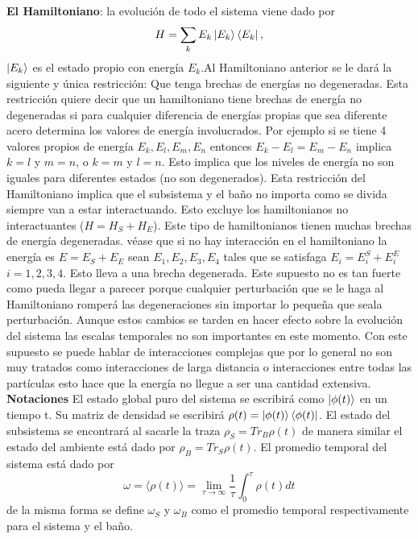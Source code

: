 \textbf{El Hamiltoniano}: la evolución de todo el sistema viene dado por 
\begin{equation}
H= \sum_{k} E_{k} \ket{E_{k}} \bra{E_{k}},
\end{equation}
$\ket{E_{k}}$ es el estado propio con energía $E_{k}$.Al Hamiltoniano anterior se le dará la siguiente y única restricción: Que tenga brechas de energías no degeneradas. Esta restricción quiere decir que  un hamiltoniano tiene brechas de energía no degeneradas si para cualquier diferencia de energías propias que sea diferente acero determina los valores de energía involucrados. Por ejemplo si se tiene 4 valores propios de energía $E_{k}, E_{l},E_{m},E_{n}$ entonces $E_{k}-E_{l}=E_{m}-E_{n} $ implica $k=l$ y $m=n$, o $k=m$ y $l=n$. Esto implica que los niveles de energía no son iguales para diferentes estados (no son degenerados).
Esta restricción del Hamiltoniano implica que el subsistema y el baño no importa como se divida siempre van a estar interactuando. Esto excluye los hamiltonianos no interactuantes ($H=H_{S}+H_{E}$). Este tipo de hamiltonianos tienen muchas brechas de energía degeneradas. véase que si no hay interacción en el hamiltoniano la energía es $E=E_{S}+E_{E}$ sean $E_{1},E_{2},E_{3},E_{4}$ tales que se satisfaga $E_{i}=E_{i}^{S}+E_{i}^{E}$ $i=1,2,3,4$. Esto lleva a una brecha degenerada. Este supuesto no es tan fuerte como pueda llegar a parecer porque cualquier perturbación que se le haga al Hamiltoniano romperá las degeneraciones sin importar lo pequeña que seala perturbación. Aunque estos cambios se tarden en hacer efecto sobre la evolución del sistema las escalas temporales no son importantes en este momento. Con este supuesto se puede hablar de interacciones complejas que por lo general no son muy tratados como interacciones de larga distancia o interacciones entre todas las partículas esto hace que la energía no llegue a ser una cantidad extensiva.
\textbf{Notaciones} El estado global puro del sistema se escribirá como $\ket{\phi(t)}$ en un tiempo t. Su matriz de densidad se escribirá $\rho(t)=\ket{\phi(t)}\bra{\phi(t)}$. El estado del subsistema se encontrará al sacarle la traza $\rho_{S}=Tr_{B} \rho(t)$ de manera similar el estado del ambiente está dado por $\rho_{B}=Tr_{S} \rho(t)$. El promedio temporal del sistema está dado por 
\begin{equation}
\omega= \langle \rho(t) \rangle= \lim_{\tau \to \infty} \frac{1}{\tau} \int_{0}^{\tau} \rho (t)dt
\end{equation}
de la misma forma se define $\omega_{S}$ y $\omega_{B}$ como el promedio temporal respectivamente para el sistema y el baño.
